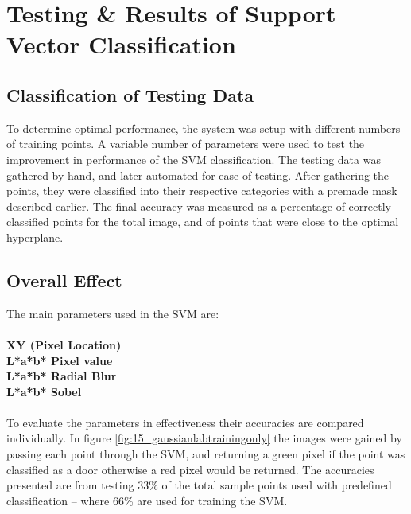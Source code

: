 \chapter {Testing \& Results of Support Vector Classification}

\section{Classification of Testing Data}
To determine optimal performance, the system was setup with different numbers of training points. A variable number of parameters were used to test the improvement in performance of the SVM classification. The testing data was gathered by hand, and later automated for ease of testing. After gathering the points, they were classified into their respective categories with a premade mask described earlier. The final accuracy was measured as a percentage of correctly classified points for the total image, and of points that were close to the optimal hyperplane.
\section{Overall Effect}
The main parameters used in the SVM are:\\ 
\\
\textbf{XY (Pixel Location)}\\
\textbf{L*a*b* Pixel value} \\
\textbf{L*a*b* Radial Blur} \\
\textbf{L*a*b* Sobel} \\
\\
To evaluate the parameters in effectiveness their accuracies are compared individually. In figure \ref{fig:15_gaussianlabtrainingonly} the images were gained by passing each point through the SVM, and returning a green pixel if the point was classified as a door otherwise a red pixel would be returned. The accuracies presented are from testing 33\% of the total sample points used with predefined classification -- where 66\% are used for training the SVM.
\newpage


